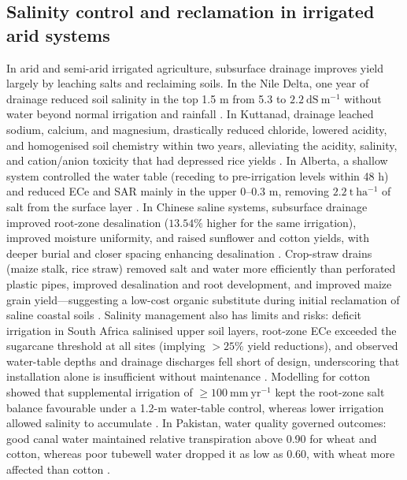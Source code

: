 \subsection{Salinity control and reclamation in irrigated arid systems}

In arid and semi-arid irrigated agriculture, subsurface drainage improves yield largely by leaching salts and reclaiming soils. In the Nile Delta, one year of drainage reduced soil salinity in the top 1.5 m from 5.3 to \(2.2\ \mathrm{dS\ m^{-1}}\) without water beyond normal irrigation and rainfall \parencite{ELMOWELHI1988}. In Kuttanad, drainage leached sodium, calcium, and magnesium, drastically reduced chloride, lowered acidity, and homogenised soil chemistry within two years, alleviating the acidity, salinity, and cation/anion toxicity that had depressed rice yields \parencite{Mathew2001}. In Alberta, a shallow system controlled the water table (receding to pre-irrigation levels within 48 h) and reduced ECe and SAR mainly in the upper 0--0.3 m, removing \(2.2\ \mathrm{t\ ha^{-1}}\) of salt from the surface layer \parencite{BENNETT1982}. In Chinese saline systems, subsurface drainage improved root-zone desalination (\(13.54\%\) higher for the same irrigation), improved moisture uniformity, and raised sunflower and cotton yields, with deeper burial and closer spacing enhancing desalination \parencite{Zhang2024c,Yang2022,Liu2025,Guo2025}. Crop-straw drains (maize stalk, rice straw) removed salt and water more efficiently than perforated plastic pipes, improved desalination and root development, and improved maize grain yield—suggesting a low-cost organic substitute during initial reclamation of saline coastal soils \parencite{Lu2018}. Salinity management also has limits and risks: deficit irrigation in South Africa salinised upper soil layers, root-zone ECe exceeded the sugarcane threshold at all sites (implying \(>25\%\) yield reductions), and observed water-table depths and drainage discharges fell short of design, underscoring that installation alone is insufficient without maintenance \parencite{Malota2016}. Modelling for cotton showed that supplemental irrigation of \(\geq 100\ \mathrm{mm\ yr^{-1}}\) kept the root-zone salt balance favourable under a 1.2-m water-table control, whereas lower irrigation allowed salinity to accumulate \parencite{Li2018}. In Pakistan, water quality governed outcomes: good canal water maintained relative transpiration above 0.90 for wheat and cotton, whereas poor tubewell water dropped it as low as 0.60, with wheat more affected than cotton \parencite{Sarwar2001}.

